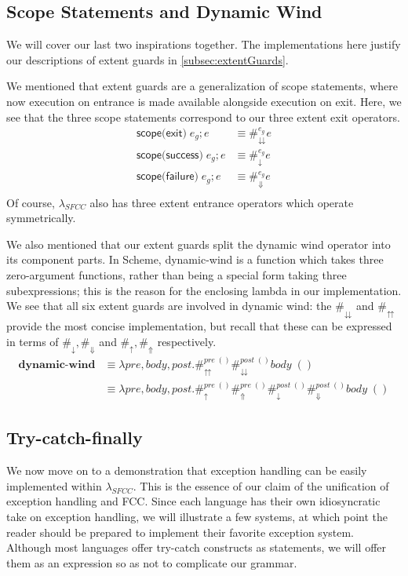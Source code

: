 \documentclass[11pt]{article}
\newcommand{\maybePage}{\newpage}
\begin{document}
\maybePage
\subsection{Scope Statements and Dynamic Wind}

We will cover our last two inspirations together.
The implementations here justify our descriptions of extent guards in \ref{subsec:extentGuards}.

We mentioned that extent guards are a generalization of scope statements, where now execution on entrance is made available alongside execution on exit.
Here, we see that the three scope statements correspond to our three extent exit operators.
\begin{align*}
\textsf{scope(exit)}\;e_g; e &\equiv \#_\downdownarrows^{e_g}e \\
\textsf{scope(success)}\;e_g; e &\equiv \#_\downarrow^{e_g}e \\
\textsf{scope(failure)}\;e_g; e &\equiv \#_\Downarrow^{e_g}e \\
\end{align*}
Of course, $\lambda_{SFCC}$ also has three extent entrance operators which operate symmetrically.

We also mentioned that our extent guards split the dynamic wind operator into its component parts.
In Scheme, dynamic-wind is a function which takes three zero-argument functions, rather than being a special form taking three subexpressions; this is the reason for the enclosing lambda in our implementation.
We see that all six extent guards are involved in dynamic wind:
the $\#_\downdownarrows$ and $\#_\upuparrows$ provide the most concise implementation, but recall that these can be expressed in terms of $\#_\downarrow, \#_\Downarrow$ and $\#_\uparrow, \#_\Uparrow$ respectively.
\begin{align*}
\textbf{dynamic-wind} &\equiv \lambda pre,body,post.
    \#_\upuparrows^{pre\;()}\#_\downdownarrows^{post\;()}body\;() \\
  &\equiv \lambda pre,body,post.
    \#_\uparrow^{pre\;()}\#_\Uparrow^{pre\;()}
    \#_\downarrow^{post\;()}\#_\Downarrow^{post\;()}
    body\;()
\end{align*}


\maybePage
\subsection{Try-catch-finally}
\label{subsec:implExn}

We now move on to a demonstration that exception handling can be easily implemented within $\lambda_{SFCC}$.
This is the essence of our claim of the unification of exception handling and FCC.
Since each language has their own idiosyncratic take on exception handling, we will illustrate a few systems, at which point the reader should be prepared to implement their favorite exception system.
Although most languages offer try-catch constructs as statements, we will offer them as an expression so as not to complicate our grammar.
\end{document}
